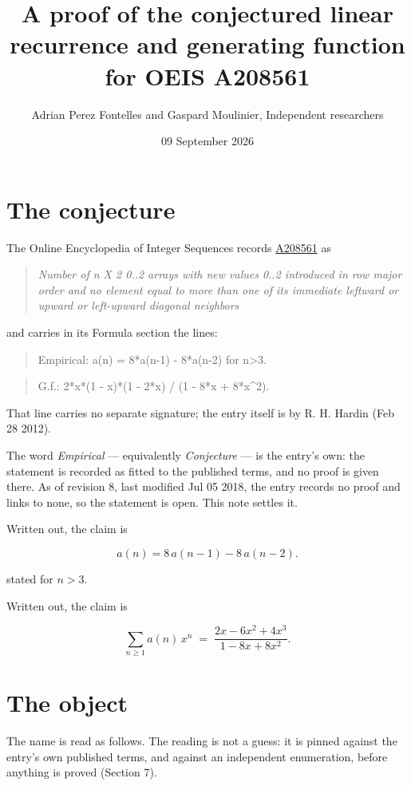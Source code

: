 \documentclass[11pt]{article}
\title{A proof of the conjectured linear recurrence and generating function for OEIS A208561}
\author{Adrian Perez Fontelles and Gaspard Moulinier, Independent researchers}
\date{09 September 2026}
\theoremstyle{definition}
\begin{document}
\maketitle
\section{The conjecture}

The Online Encyclopedia of Integer Sequences records \href{https://oeis.org/A208561}{A208561} as

\begin{quote}\itshape Number of n X 2 0..2 arrays with new values 0..2 introduced in row major order and no element equal to more than one of its immediate leftward or upward or left-upward diagonal neighbors\end{quote}

and carries in its Formula section the lines:

\begin{quote}\ttfamily Empirical: a(n) = 8*a(n-1) - 8*a(n-2) for n>3.\end{quote}

\begin{quote}\ttfamily G.f.: 2*x*(1 - x)*(1 - 2*x) / (1 - 8*x + 8*x\textasciicircum{}2).\end{quote}

That line carries no separate signature; the entry itself is by R. H. Hardin (Feb 28 2012).

The word {\itshape Empirical} --- equivalently {\itshape Conjecture} --- is the entry's own: the statement is recorded as fitted to the published terms, and no proof is given there. As of revision 8, last modified Jul 05 2018, the entry records no proof and links to none, so the statement is open. This note settles it.

Written out, the claim is

\[a(n) = 8\,a(n-1) - 8\,a(n-2).\]

stated for $n > 3$.

Written out, the claim is

\[\sum_{n \ge 1} a(n)\,x^n \;=\; \frac{2x - 6x^{2} + 4x^{3}}{1 - 8x + 8x^{2}}.\]

\section{The object}

The name is read as follows. The reading is not a guess: it is pinned against the entry's own published terms, and against an independent enumeration, before anything is proved (Section 7).
\end{document}
